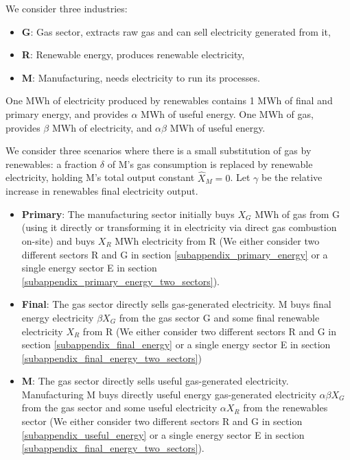 \documentclass[11pt]{article}
\begin{document}
We consider three industries:
\begin{itemize}
\item \textbf{G}: Gas sector, extracts raw gas and can sell electricity generated from it,
\item \textbf{R}: Renewable energy, produces renewable electricity,
\item \textbf{M}: Manufacturing, needs electricity to run its processes.
\end{itemize}


One MWh of electricity produced by renewables contains 1 MWh of final and primary energy, and provides $\alpha$ MWh of useful energy. One MWh of gas, provides $\beta$ MWh of electricity, and $\alpha\beta$ MWh of useful energy.
 

We consider three scenarios where there is a small substitution of gas by renewables: a fraction $\delta$ of M's gas consumption is replaced by renewable electricity, holding M's total output constant $\hat{X}_M=0$. Let $\gamma$ be the relative increase in renewables final electricity output.
\begin{itemize}
\item \textbf{Primary}: The manufacturing sector initially buys $X_G$ MWh of gas from G (using it directly or transforming it in electricity via direct gas combustion on-site) and buys $X_R$ MWh electricity from R (We either consider two different sectors R and G in section \ref{subappendix_primary_energy} or a single energy sector E in section \ref{subappendix_primary_energy_two_sectors}).
\item \textbf{Final}: The gas sector directly sells gas-generated electricity. M buys final energy electricity $\beta X_G$ from the gas sector G and some final renewable electricity  $X_R$  from R (We either consider two different sectors R and G in section \ref{subappendix_final_energy} or a single energy sector E in section \ref{subappendix_final_energy_two_sectors})
\item \textbf{M}: The gas sector directly sells useful gas-generated electricity. Manufacturing M buys directly useful energy gas-generated electricity $\alpha \beta X_G$ from the gas sector and some useful electricity $\alpha X_R$ from the renewables sector 
(We either consider two different sectors R and G in section \ref{subappendix_useful_energy} or a single energy sector E in section \ref{subappendix_final_energy_two_sectors}).
\end{itemize}
\end{document}
